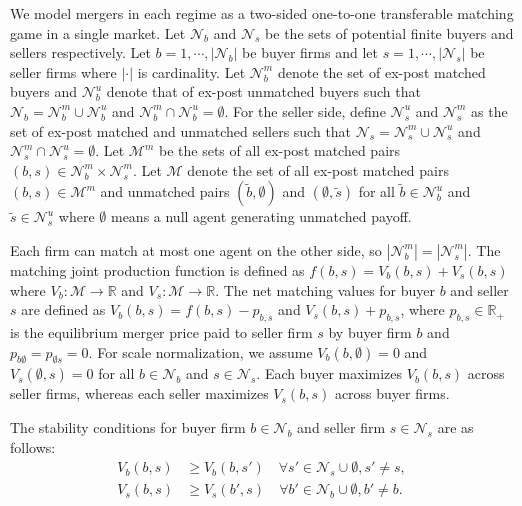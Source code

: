 \documentclass[10pt]{article}
\begin{document}
We model mergers in each regime as a two-sided one-to-one transferable matching game in a single market. Let $\mathcal{N}_b$ and $\mathcal{N}_s$ be the sets of potential finite buyers and sellers respectively. Let $b=1,\cdots,|\mathcal{N}_b|$ be buyer firms and let $s=1,\cdots,|\mathcal{N}_s|$ be seller firms where $|\cdot|$ is cardinality. Let $\mathcal{N}_{b}^{m}$ denote the set of ex-post matched buyers and $\mathcal{N}_{b}^{u}$ denote that of ex-post unmatched buyers such that $\mathcal{N}_b= \mathcal{N}_{b}^{m}\cup\mathcal{N}_{b}^{u}$ and $\mathcal{N}_{b}^{m}\cap\mathcal{N}_{b}^{u}=\emptyset$. For the seller side, define $\mathcal{N}_{s}^{u}$ and $\mathcal{N}_{s}^{m}$ as the set of ex-post matched and unmatched sellers such that $\mathcal{N}_s= \mathcal{N}_{s}^{m}\cup\mathcal{N}_{s}^{u}$ and $\mathcal{N}_{s}^{m}\cap\mathcal{N}_{s}^{u}=\emptyset$. Let $\mathcal{M}^m$ be the sets of all ex-post matched pairs $(b,s)\in\mathcal{N}_{b}^{m}\times \mathcal{N}_{s}^{m}$. Let $\mathcal{M}$ denote the set of all ex-post matched pairs $(b,s)\in\mathcal{M}^{m}$ and unmatched pairs $(\tilde{b},\emptyset)$ and $(\emptyset,\tilde{s})$ for all $\tilde{b}\in \mathcal{N}_b^u$ and $\tilde{s}\in \mathcal{N}_s^u$ where $\emptyset$ means a null agent generating unmatched payoff. 

Each firm can match at most one agent on the other side, so  $|\mathcal{N}_b^{m}|=|\mathcal{N}_s^{m}|$. The matching joint production function is defined as $f(b,s)=V_b(b,s)+V_s(b,s)$ where $V_b:\mathcal{M}\rightarrow \mathbb{R}$ and $V_s:\mathcal{M}\rightarrow \mathbb{R}$. The net matching values for buyer $b$ and seller $s$ are defined as $V_b(b,s)=f(b,s)-p_{b,s}$ and $V_s(b,s)+p_{b,s}$, where $p_{b,s}\in \mathbb{R}_{+}$ is the equilibrium merger price paid to seller firm $s$ by buyer firm $b$ and $p_{b\emptyset}=p_{\emptyset s}=0$. For scale normalization, we assume $V_b(b,\emptyset)=0$ and $V_s(\emptyset,s)=0$ for all $b\in \mathcal{N}_b$ and $s\in \mathcal{N}_s$. Each buyer maximizes $V_b(b,s)$ across seller firms, whereas each seller maximizes $V_s(b,s)$ across buyer firms. 

The stability conditions for buyer firm $b \in \mathcal{N}_b$ and seller firm $s \in \mathcal{N}_s$ are as follows:
\begin{align}
    V_b(b,s) &\ge V_b(b,s') \quad \forall s' \in \mathcal{N}_s \cup \emptyset,s'\neq s,\label{eq:stability_ineq}\\
    V_s(b,s) &\ge V_s(b',s) \quad \forall b' \in \mathcal{N}_b\cup \emptyset,b'\neq b.\nonumber
\end{align}
\end{document}
